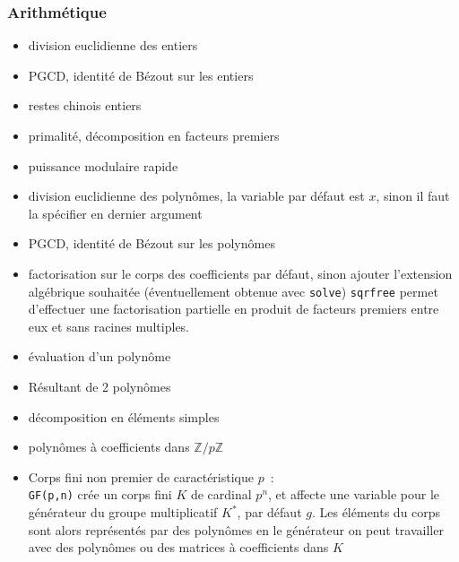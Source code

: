 \documentclass[a4paper,11pt]{article}
\newcommand{\Z}{{\mathbb{Z}}}
\begin{document}
\begin{giacjshere}
\subsubsection{Arithm\'etique}
\begin{itemize}
\item division euclidienne des entiers
\item PGCD, identit\'e de B\'ezout sur les entiers
\item restes chinois entiers
\item primalit\'e, d\'ecomposition en facteurs premiers
\item puissance modulaire rapide
\item division euclidienne des polyn\^omes, la variable par d\'efaut est $x$,
sinon il faut la sp\'ecifier en dernier argument
\item PGCD, identit\'e de B\'ezout sur les polyn\^omes
\item factorisation sur le corps des coefficients par d\'efaut, sinon 
ajouter l'extension alg\'ebrique souhait\'ee (\'eventuellement obtenue
avec \verb|solve|)
\verb|sqrfree| permet d'effectuer une factorisation partielle
en produit de facteurs premiers entre eux et sans racines multiples.
\item \'evaluation d'un polyn\^ome
\item R\'esultant de 2 polyn\^omes
\item d\'ecomposition en \'el\'ements simples
\item polyn\^omes \`a coefficients dans $\Z/p\Z$
\item Corps fini non premier de caract\'eristique $p$~:\\
\verb|GF(p,n)| cr\'ee un corps fini $K$ de cardinal $p^n$, 
et affecte une variable
pour le g\'en\'erateur du groupe multiplicatif $K^*$, par
d\'efaut $g$. Les \'el\'ements du corps sont alors repr\'esent\'es
par des polyn\^omes en le g\'en\'erateur
on peut travailler avec des polyn\^omes ou des matrices
\`a coefficients dans $K$
\end{itemize}


\end{giacjshere}
\end{document}
